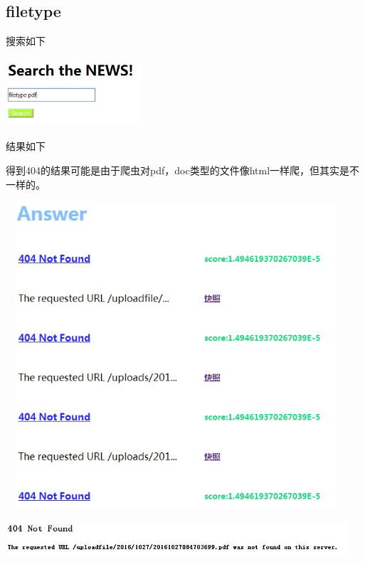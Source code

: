 ﻿\documentclass[UTF8]{ctexart}
\begin{document}
\begin{flushleft}
\subsection{filetype}
搜索如下
\par{}
\includegraphics[width=2.00in,height=1.00in]{29.jpg}
\par{}
结果如下
\par{}
得到404的结果可能是由于爬虫对pdf，doc类型的文件像html一样爬，但其实是不一样的。
\par{}
\includegraphics[width=5.00in,height=4.50in]{30.jpg}
\par{}
\includegraphics[width=5.00in,height=0.50in]{31.jpg}
\par{}

\end{flushleft}
\end{document}
